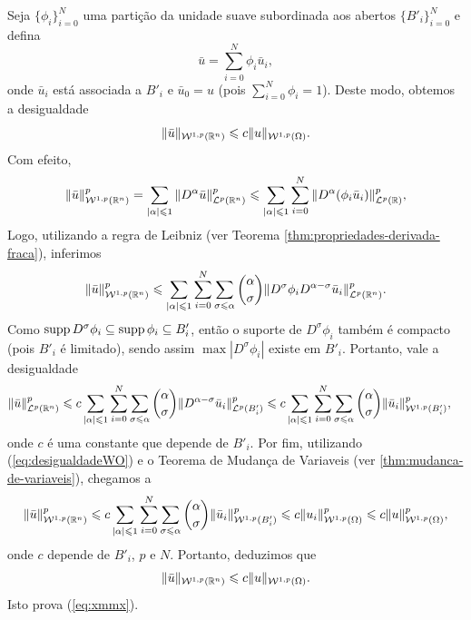 \begin{prf}
    Seja $\{\phi_i\}_{i=0}^N$ uma partição da unidade suave subordinada aos abertos $\{B'_i\}_{i=0}^N$ e defina
    \begin{equation}
        \bar u = \sum_{i=0}^N \phi_i \bar u_i,
    \end{equation}
    onde $\bar u_i$ está associada a $B'_i$ e $\bar u_0 = u$ (pois $\sum_{i=0}^N \phi_i = 1$). Deste modo, obtemos a desigualdade
    \begin{equation} \label{eq:xmmx}
        \Vert \bar u \Vert_{\mathcal{W}^{1,p}(\mathbb{R}^n)} \leqslant c \Vert u \Vert_{\mathcal{W}^{1,p}(\Omega)}.
    \end{equation}
    Com efeito,
    \[
        \Vert \bar u \Vert^p_{\mathcal{W}^{1,p}(\mathbb{R}^n)} = \sum_{|\alpha| \leqslant 1} \Vert D^\alpha \bar u \Vert^p_{\mathcal{L}^p(\mathbb{R}^n)}
        \leqslant \sum_{|\alpha| \leqslant 1} \sum_{i=0}^N \Vert D^\alpha (\phi_i \bar u_i) \Vert_{\mathcal{L}^p(\mathbb{R})}^p,
    \]
    Logo, utilizando a regra de Leibniz (ver Teorema \ref{thm:propriedades-derivada-fraca}), inferimos
    \[
        \Vert \bar u \Vert_{\mathcal{W}^{1,p}(\mathbb{R}^n)}^p \leqslant \sum_{|\alpha| \leqslant 1} \sum_{i=0}^{N} \sum_{\sigma \leqslant \alpha} \binom{\alpha}{\sigma} \Vert D^\sigma \phi_i D^{\alpha - \sigma} \bar u_i \Vert_{\mathcal{L}^p(\mathbb{R}^n)}^p.
    \]
    Como $\mathrm{supp}\, D^\sigma \phi_i \subseteq \mathrm{supp}\, \phi_i \subseteq B'_i$, então o suporte de $D^\sigma \phi_i$ também é compacto (pois $B'_i$ é limitado), sendo assim $\max |D^\sigma \phi_i|$ existe em $B'_i$.
    Portanto, vale a desigualdade
    \[
        \begin{aligned}
            \Vert \bar u \Vert_{\mathcal{L}^p(\mathbb{R}^n)}^p &\leqslant c\sum_{|\alpha| \leqslant 1} \sum_{i=0}^{N} \sum_{\sigma \leqslant \alpha} \binom{\alpha}{\sigma} \Vert D^{\alpha - \sigma} \bar u_i \Vert_{\mathcal{L}^p(B'_i)}^p \leqslant c\sum_{|\alpha| \leqslant 1} \sum_{i=0}^{N} \sum_{\sigma \leqslant \alpha} \binom{\alpha}{\sigma} \Vert \bar u_i \Vert_{\mathcal{W}^{1,p}(B'_i)}^p,
        \end{aligned}
    \]
    onde $c$ é uma constante que depende de $B'_i$.
    Por fim, utilizando (\ref{eq:desigualdadeWO}) e o Teorema de Mudança de Variaveis (ver \ref{thm:mudanca-de-variaveis}), chegamos a
    \[
         \Vert \bar u \Vert^p_{\mathcal{W}^{1,p}(\mathbb{R}^n)} \leqslant c\sum_{|\alpha| \leqslant 1} \sum_{i=0}^{N} \sum_{\sigma \leqslant \alpha} \binom{\alpha}{\sigma} \Vert \bar u_i \Vert_{\mathcal{W}^{1,p}(B'_i)}^p \leqslant c\Vert u_i \Vert_{\mathcal{W}^{1,p}(\Omega)}^p \leqslant c \Vert u \Vert_{\mathcal{W}^{1,p}(\Omega)}^p,
    \]
    onde $c$ depende de $B'_i$, $p$ e $N$.
    Portanto, deduzimos que
    \begin{equation} \label{eq:Mm}
        \Vert \bar u \Vert_{\mathcal{W}^{1,p}(\mathbb{R}^n)} \leqslant c \Vert u \Vert_{\mathcal{W}^{1,p}(\Omega)}.
    \end{equation}
    Isto prova (\ref{eq:xmmx}).


\end{prf}
